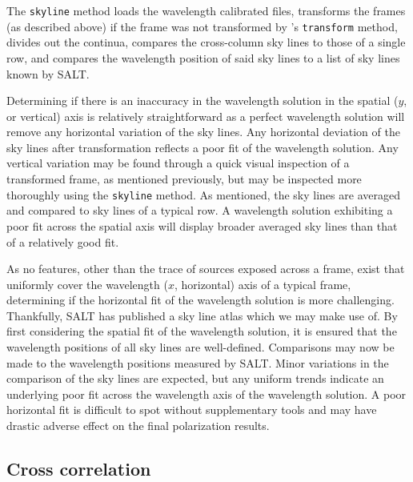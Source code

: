 The \texttt{skyline} method loads the wavelength calibrated files, transforms the frames (as described above) if the frame was not transformed by \iraf's \texttt{transform} method, divides out the continua, compares the cross-column sky lines to those of a single row, and compares the wavelength position of said sky lines to a list of sky lines known by \gls{SALT}.

Determining if there is an inaccuracy in the wavelength solution in the spatial ($y$, or vertical) axis is relatively straightforward as a perfect wavelength solution will remove any horizontal variation of the sky lines. Any horizontal deviation of the sky lines after transformation reflects a poor fit of the wavelength solution. Any vertical variation may be found through a quick visual inspection of a transformed frame, as mentioned previously, but may be inspected more thoroughly using the \texttt{skyline} method. As mentioned, the sky lines are averaged and compared to sky lines of a typical row. A wavelength solution exhibiting a poor fit across the spatial axis will display broader averaged sky lines than that of a relatively good fit.

As no features, other than the trace of sources exposed across a frame, exist that uniformly cover the wavelength ($x$, horizontal) axis of a typical frame, determining if the horizontal fit of the wavelength solution is more challenging. Thankfully, \gls{SALT} has published a sky line atlas which we may make use of. By first considering the spatial fit of the wavelength solution, it is ensured that the wavelength positions of all sky lines are well-defined. Comparisons may now be made to the wavelength positions measured by \gls{SALT}. Minor variations in the comparison of the sky lines are expected, but any uniform trends indicate an underlying poor fit across the wavelength axis of the wavelength solution. A poor horizontal fit is difficult to spot without supplementary tools and may have drastic adverse effect on the final polarization results.

\subsection{Cross correlation}



